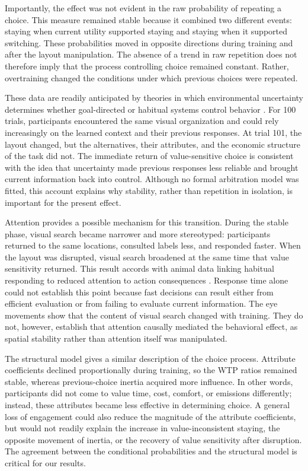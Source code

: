 \documentclass[man,natbib,floatsintext]{apa7}
\begin{document}
Importantly, the effect was not evident in the raw probability of repeating a choice. This measure remained stable because it combined two different events: staying when current utility supported staying and staying when it supported switching. These probabilities moved in opposite directions during training and after the layout manipulation. The absence of a trend in raw repetition does not therefore imply that the process controlling choice remained constant. Rather, overtraining changed the conditions under which previous choices were repeated.

These data are readily anticipated by theories in which environmental uncertainty determines whether goal-directed or habitual systems control behavior \citep{daw2005, lee2014}. For 100 trials, participants encountered the same visual organization and could rely increasingly on the learned context and their previous responses. At trial 101, the layout changed, but the alternatives, their attributes, and the economic structure of the task did not. The immediate return of value-sensitive choice is consistent with the idea that uncertainty made previous responses less reliable and brought current information back into control. Although no formal arbitration model was fitted, this account explains why stability, rather than repetition in isolation, is important for the present effect.

Attention provides a possible mechanism for this transition. During the stable phase, visual search became narrower and more stereotyped: participants returned to the same locations, consulted labels less, and responded faster. When the layout was disrupted, visual search broadened at the same time that value sensitivity returned. This result accords with animal data linking habitual responding to reduced attention to action consequences \citep{thrailkill2018, bouton2020, bouton2024}. Response time alone could not establish this point because fast decisions can result either from efficient evaluation or from failing to evaluate current information. The eye movements show that the content of visual search changed with training. They do not, however, establish that attention causally mediated the behavioral effect, as spatial stability rather than attention itself was manipulated.

The structural model gives a similar description of the choice process. Attribute coefficients declined proportionally during training, so the WTP ratios remained stable, whereas previous-choice inertia acquired more influence. In other words, participants did not come to value time, cost, comfort, or emissions differently; instead, these attributes became less effective in determining choice. A general loss of engagement could also reduce the magnitude of the attribute coefficients, but would not readily explain the increase in value-inconsistent staying, the opposite movement of inertia, or the recovery of value sensitivity after disruption. The agreement between the conditional probabilities and the structural model is critical for our results.
\end{document}
